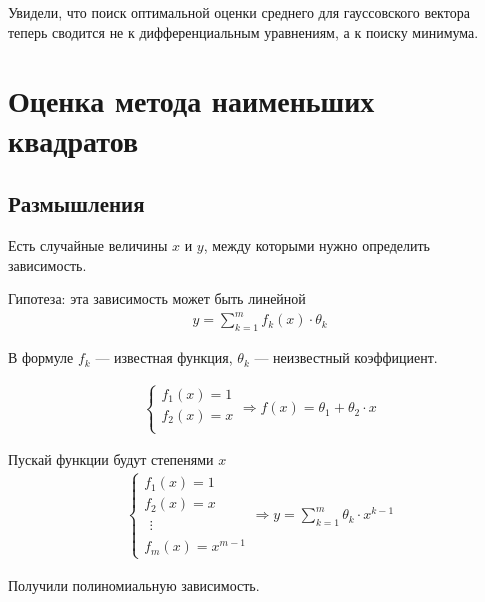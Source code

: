 Увидели, что поиск оптимальной оценки среднего для гауссовского вектора
теперь сводится не к дифференциальным уравнениям, а к поиску минимума.

\section{Оценка метода наименьших квадратов}

\subsection{Размышления}

Есть случайные величины $x$ и $y$, между которыми нужно определить зависимость.

Гипотеза: эта зависимость может быть линейной
\begin{align*}
  y = \sum_{k=1}^{m}f_k\left( x \right) \cdot \theta_k
\end{align*}

В формуле $f_k$ --- известная функция, $\theta_k$ --- неизвестный коэффициент.

\begin{example}
  \begin{align*}
      \begin{cases}
      f_1\left( x \right) = 1 \\
      f_2\left( x \right) = x \\
      \end{cases} \Rightarrow
      f\left( x \right) = \theta_1 + \theta_2 \cdot x
  \end{align*}
\end{example}

\begin{example}
  Пускай функции будут степенями $x$
  \begin{align*}
      \begin{cases}
      f_1\left( x \right) = 1 \\
      f_2\left( x \right) = x \\
      \begin{array}{c}
      \vdots
      \end{array} \\
      f_m\left( x \right) = x^{m-1}
      \end{cases} \Rightarrow
      y = \sum_{k=1}^{m} \theta_k \cdot x^{k-1}
  \end{align*}

  Получили полиномиальную зависимость.
\end{example}


